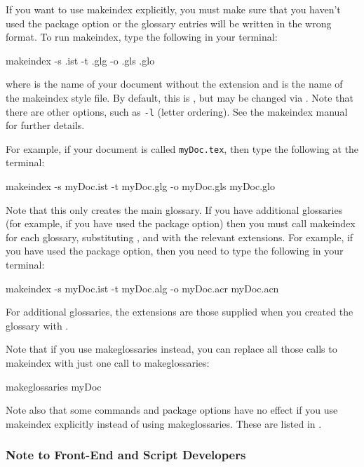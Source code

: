 \documentclass{nlctdoc}
\begin{document}
If you want to use \gls{makeindex} explicitly, you must
make sure that you haven't used the  package
option or the glossary entries will be written in the wrong
format. To run \gls*{makeindex}, type the following in
your terminal:
\begin{prompt}
makeindex -s .ist -t .glg -o .gls .glo
\end{prompt}
where  is the name of your document without the
 extension and  is the 
name of the \gls{makeindex} style file. By default, this is
, but may be changed via
. Note that there are other options, 
such as \texttt{-l} (letter ordering). See the \gls*{makeindex}
manual for further details.

For example, if your document is called \texttt{myDoc.tex}, then
type the following at the terminal:
\begin{prompt}
makeindex -s myDoc.ist -t myDoc.glg -o myDoc.gls myDoc.glo
\end{prompt}
Note that this only creates the main glossary. If you have
additional glossaries (for example, if you have used the
 package option) then you must call 
\gls{makeindex} for each glossary, substituting 
,  and  with the
relevant extensions. For example, if you have used the
 package option, then you need to type the
following in your terminal:
\begin{prompt}
makeindex -s myDoc.ist -t myDoc.alg -o myDoc.acr myDoc.acn
\end{prompt}
For additional glossaries, the extensions are those supplied
when you created the glossary with .

Note that if you use \gls{makeglossaries} instead, you can
replace all those calls to \gls{makeindex} with just one call
to \gls*{makeglossaries}:
\begin{prompt}
makeglossaries myDoc
\end{prompt}
Note also that some commands and package options have no effect if 
you use \gls*{makeindex} explicitly instead of using 
\gls{makeglossaries}. These are listed in 
.


\subsubsection{Note to Front-End and Script Developers}
\end{document}
